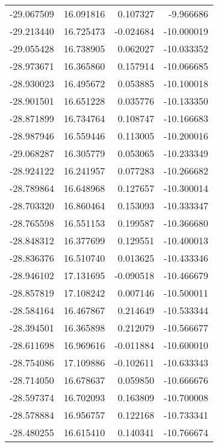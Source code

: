 \begin{tabular}{rrrr}
      -29.067509 &        16.091816 &    0.107327 &  -9.966686 \\
      -29.213440 &        16.725473 &   -0.024684 & -10.000019 \\
      -29.055428 &        16.738905 &    0.062027 & -10.033352 \\
      -28.973671 &        16.365860 &    0.157914 & -10.066685 \\
      -28.930023 &        16.495672 &    0.053885 & -10.100018 \\
      -28.901501 &        16.651228 &    0.035776 & -10.133350 \\
      -28.871899 &        16.734764 &    0.108747 & -10.166683 \\
      -28.987946 &        16.559446 &    0.113005 & -10.200016 \\
      -29.068287 &        16.305779 &    0.053065 & -10.233349 \\
      -28.924122 &        16.241957 &    0.077283 & -10.266682 \\
      -28.789864 &        16.648968 &    0.127657 & -10.300014 \\
      -28.703320 &        16.860464 &    0.153093 & -10.333347 \\
      -28.765598 &        16.551153 &    0.199587 & -10.366680 \\
      -28.848312 &        16.377699 &    0.129551 & -10.400013 \\
      -28.836376 &        16.510740 &    0.013625 & -10.433346 \\
      -28.946102 &        17.131695 &   -0.090518 & -10.466679 \\
      -28.857819 &        17.108242 &    0.007146 & -10.500011 \\
      -28.584164 &        16.467867 &    0.214649 & -10.533344 \\
      -28.394501 &        16.365898 &    0.212079 & -10.566677 \\
      -28.611698 &        16.969616 &   -0.011884 & -10.600010 \\
      -28.754086 &        17.109886 &   -0.102611 & -10.633343 \\
      -28.714050 &        16.678637 &    0.059850 & -10.666676 \\
      -28.597374 &        16.702093 &    0.163809 & -10.700008 \\
      -28.578884 &        16.956757 &    0.122168 & -10.733341 \\
      -28.480255 &        16.615410 &    0.140341 & -10.766674 \\

\end{tabular}
